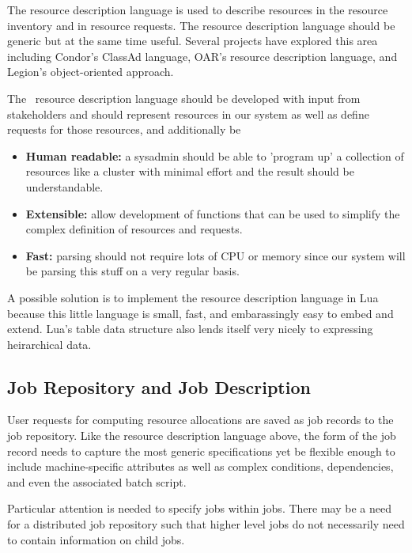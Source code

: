 The resource description language is used to describe resources
in the resource inventory and in resource requests.
The resource description language should be generic but at the same
time useful.  Several projects have explored this area including
Condor's ClassAd language\cite{ClassAd},
OAR's resource description language\cite{Oar},
and Legion's\cite{LegionGrid}\cite{LegionRM} object-oriented approach.

The \ngrm\ resource description language should be developed with
input from stakeholders and should represent resources in our system as
well as define requests for those resources, and additionally be
\begin{itemize}
\item{\textbf{Human readable:} a sysadmin should be able to 'program up'
a collection of resources like a cluster with minimal
effort and the result should be understandable.}
\item{\textbf{Extensible:} allow development of functions that can be used
to simplify the complex definition of resources and requests.}
\item{\textbf{Fast:} parsing should not require lots of CPU or memory since
our system will be parsing this stuff on a very regular basis.}
\end{itemize}

A possible solution is to implement the
resource description language in Lua\cite{Lua} because this
little language is small, fast, and embarassingly easy to embed and
extend.  Lua's table data structure also lends itself very nicely to
expressing heirarchical data.

\subsection{Job Repository and Job Description}
\label{sect:jobdb}

User requests for computing resource allocations are saved as job
records to the job repository.  Like the resource description language
above, the form of the job record needs to capture the most generic
specifications yet be flexible enough to include machine-specific
attributes as well as complex conditions, dependencies, and even the
associated batch script.

Particular attention is needed to specify jobs within jobs.  There may
be a need for a distributed job repository such that higher level jobs
do not necessarily need to contain information on child jobs.

